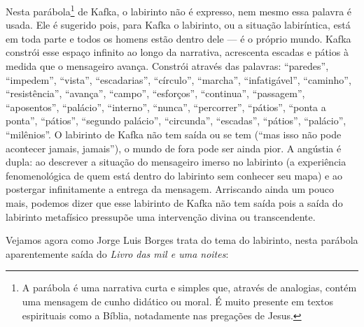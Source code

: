 Nesta parábola\footnote{A parábola é uma narrativa curta e simples
  que, através de analogias, contém uma mensagem de cunho didático ou
  moral. É muito presente em textos espirituais como a Bíblia,
  notadamente nas pregações de Jesus.} de Kafka, o labirinto não é expresso, nem mesmo essa
palavra é usada. Ele é sugerido pois, para Kafka o
labirinto, ou a situação labiríntica, está em toda parte e todos os
homens estão dentro dele --- é o próprio mundo. Kafka constrói esse
espaço infinito ao longo da narrativa, acrescenta escadas e pátios à
medida que o mensageiro avança. Constrói através das palavras:
``paredes'', ``impedem'', ``vista'', ``escadarias'', ``círculo'',
``marcha'', ``infatigável'', ``caminho'', ``resistência'', ``avança'',
``campo'', ``esforços'', ``continua'', ``passagem'', ``aposentos'',
``palácio'', ``interno'', ``nunca'', ``percorrer'', ``pátios'', ``ponta
a ponta'', ``pátios'', ``segundo palácio'', ``circunda'', ``escadas'',
``pátios'', ``palácio'', ``milênios''. O labirinto de Kafka não tem 
saída ou se tem (``mas isso não pode acontecer jamais, jamais''), o
mundo de fora pode ser ainda pior. A angústia é dupla: ao
descrever a situação do mensageiro imerso no labirinto (a experiência
fenomenológica de quem está dentro do labirinto sem conhecer seu mapa)
e ao postergar infinitamente a entrega da mensagem. Arriscando ainda um
pouco mais, podemos dizer que esse labirinto de Kafka não tem saída pois
a saída do labirinto metafísico pressupõe uma intervenção divina ou
transcendente.

Vejamos agora como Jorge Luis Borges trata do tema do labirinto, nesta
parábola aparentemente saída do \emph{Livro das mil e uma noites}:

